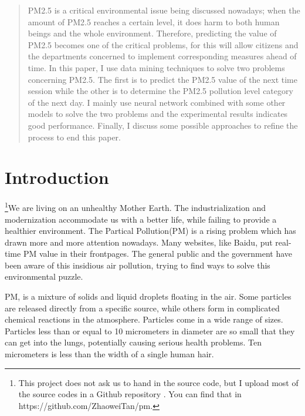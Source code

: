\documentclass{sig-alternate}
\begin{document}
\date{5 July 2015}


\maketitle
\begin{abstract}
PM2.5 is a critical environmental issue being discussed nowadays; when the amount of PM2.5 reaches a certain level, it does harm to both human beings and the whole environment. Therefore, predicting the value of PM2.5 becomes one of the critical problems, for this will allow citizens and the departments concerned to implement corresponding measures ahead of time. In this paper, I use data mining techniques to solve two problems concerning PM2.5. The first is to predict the PM2.5 value of the next time session while the other is to determine the PM2.5 pollution level category of the next day. I mainly use neural network combined with some other models to solve the two problems and the experimental results indicates good performance. Finally, I discuss some possible approaches to refine the process to end this paper.
\end{abstract}




\section{Introduction}
\footnote{This project does not ask us to hand in the source code, but I upload most of the source codes in a Github repository . You can find that in https://github.com/ZhaoweiTan/pm.}We are living on an unhealthy Mother Earth. The industrialization and modernization accommodate us with a better life, while failing to provide a healthier environment. The Partical Pollution(PM) is a rising problem which has drawn more and more attention nowadays. Many websites, like Baidu, put real-time PM value in their frontpages. The general public and the government have been aware of this insidious air pollution, trying to find ways to solve this environmental puzzle.

PM, is a mixture of solids and liquid droplets floating in the air\cite{pm}. Some particles are released directly from a specific source, while others form in complicated chemical reactions in the atmosphere. Particles come in a wide range of sizes. Particles less than or equal to 10 micrometers in diameter are so small that they can get into the lungs, potentially causing serious health problems. Ten micrometers is less than the width of a single human hair.
\end{document}
